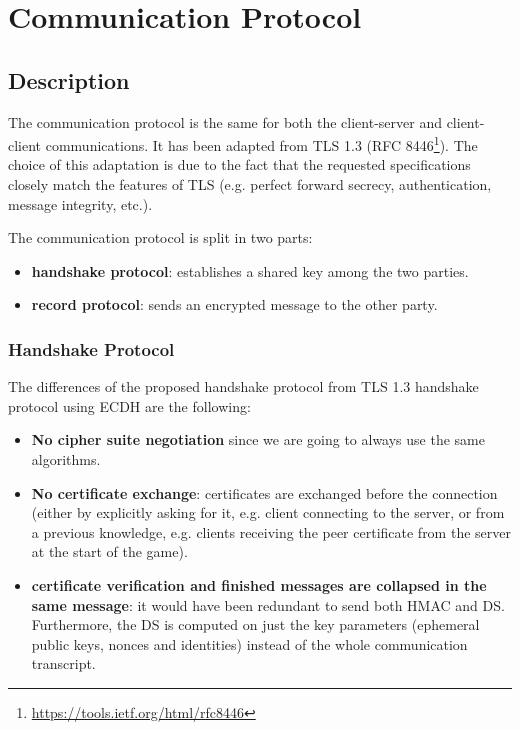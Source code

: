\section{Communication Protocol}

\subsection{Description}
The communication protocol is the same for both the client-server and client-client 
communications. 
It has been adapted from TLS 1.3 (RFC 8446\footnote{\url{https://tools.ietf.org/html/rfc8446}}).
The choice of this adaptation is due to the fact that the requested specifications 
closely match the features of TLS (e.g. perfect forward secrecy, authentication, 
message integrity, etc.).

The communication protocol is split in two parts:
\begin{itemize}
    \item \textbf{handshake protocol}: establishes a shared key among the two 
        parties.
    \item \textbf{record protocol}: sends an encrypted message to the other 
        party.
\end{itemize} 

\subsubsection{Handshake Protocol}
The differences of the proposed handshake protocol from TLS 1.3 handshake protocol
using ECDH are the following:
\begin{itemize}
    \item \textbf{No cipher suite negotiation} since we are going to always use 
        the same algorithms.
    \item \textbf{No certificate exchange}: certificates are exchanged before the 
        connection (either by explicitly asking for it, e.g. client connecting to
        the server, or from a previous knowledge, e.g. clients receiving the 
        peer certificate from the server at the start of the game).
    \item \textbf{certificate verification and finished messages are collapsed in the same 
        message}: it would have been redundant to send both HMAC and DS. 
        Furthermore, the DS is computed on just the key parameters (ephemeral 
        public keys, nonces and identities) instead of the whole communication
        transcript.
\end{itemize}

